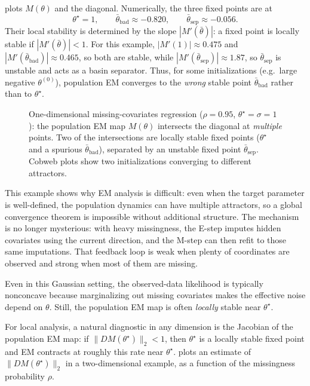 \documentclass[11pt]{article}
\begin{document}
 plots $M(\theta)$ and the diagonal.
Numerically, the three fixed points are at
\[
\theta^\star=1,
\qquad
\bar\theta_{\mathrm{bad}}\approx -0.820,
\qquad
\bar\theta_{\mathrm{sep}}\approx -0.056.
\]
Their local stability is determined by the slope $|M'(\bar\theta)|$: a fixed point is locally stable if $|M'(\bar\theta)|<1$.
For this example, $|M'(1)|\approx 0.475$ and $|M'(\bar\theta_{\mathrm{bad}})|\approx 0.465$, so both are stable, while $|M'(\bar\theta_{\mathrm{sep}})|\approx 1.87$, so $\bar\theta_{\mathrm{sep}}$ is unstable and acts as a basin separator.
Thus, for some initializations (e.g.\ large negative $\theta^{(0)}$), population EM converges to the \emph{wrong} stable point $\bar\theta_{\mathrm{bad}}$ rather than to $\theta^\star$.

\begin{figure}[t]
  \centering
  
  \caption{One-dimensional missing-covariates regression ($\rho=0.95$, $\theta^\star=\sigma=1$): the population EM map $M(\theta)$ intersects the diagonal at \emph{multiple} points. Two of the intersections are locally stable fixed points ($\theta^\star$ and a spurious $\bar\theta_{\mathrm{bad}}$), separated by an unstable fixed point $\bar\theta_{\mathrm{sep}}$. Cobweb plots show two initializations converging to different attractors.}
  \label{fig:em-missing-1d-spurious-fixed-points}
\end{figure}

This example shows why EM analysis is difficult: even when the target parameter is well-defined, the population dynamics can have multiple attractors, so a global convergence theorem is impossible without additional structure.
The mechanism is no longer mysterious:
with heavy missingness, the E-step imputes hidden covariates using the current direction, and the M-step can then refit to those same imputations.
That feedback loop is weak when plenty of coordinates are observed and strong when most of them are missing.

Even in this Gaussian setting, the observed-data likelihood is typically nonconcave because marginalizing out missing covariates makes the effective noise depend on $\theta$.
Still, the population EM map is often \emph{locally} stable near $\theta^\star$.

For local analysis, a natural diagnostic in any dimension is the Jacobian of the population EM map:
if $\|DM(\theta^\star)\|_2<1$, then $\theta^\star$ is a locally stable fixed point and EM contracts at roughly this rate near $\theta^\star$.
 plots an estimate of $\|DM(\theta^\star)\|_2$ in a two-dimensional example, as a function of the missingness probability $\rho$.
\end{document}
